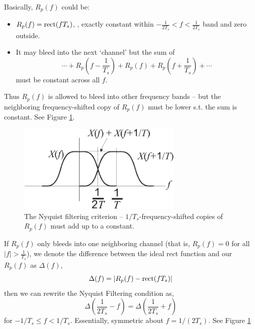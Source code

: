 
Basically, $R_p(f)$ could be:
\begin{itemize}
  \item $R_p(f) = \mbox{rect}(fT_{s})$, \ie, exactly constant within $-\frac{1}{2T_{s}} < f < \frac{1}{2T_{s}}$ band
  and zero outside.
  \item It may bleed into the next `channel' but the sum of
    \[ \cdots + R_p\left(f - \frac{1}{T_{s}}\right) + R_p(f) +
          R_p\left(f + \frac{1}{T_{s}}\right) + \cdots \]
    must be constant across all $f$.
\end{itemize}
Thus $R_p(f)$ is allowed to bleed into other frequency bands -- but
the neighboring frequency-shifted copy of $R_p(f)$ must be lower s.t.
the sum is constant.  See Figure \ref{F:NyquistFiltering}.

\begin{figure}[htbp]
\centerline{\includegraphics[width=0.7\textwidth]{../images/NyquistFiltering.eps}}
\caption{The Nyquist filtering criterion --
$1/T_{s}$-frequency-shifted copies of $R_p(f)$ must add up to a
constant.}\label{F:NyquistFiltering}
\end{figure}

If $R_p(f)$ only bleeds into one neighboring channel (that is, $R_p(f) =
0$ for all $|f| > \frac{1}{T_{s}}$), we denote the difference
between the ideal rect function and our $R_p(f)$ as $\Delta(f)$,
\[
  \Delta(f) = \left| R_p(f) - \mbox{rect}(fT_{s}) \right|
\]
then we can rewrite the Nyquist Filtering condition as,
\[
   \Delta\left( \frac{1}{2T_{s}} - f \right) = \Delta\left( \frac{1}{2T_{s}} + f \right)
\]
for $-1/T_{s} \le f < 1/T_{s}$.  Essentially, symmetric about
$f=1/(2T_{s})$. See Figure \ref{F:NyquistFiltering}

